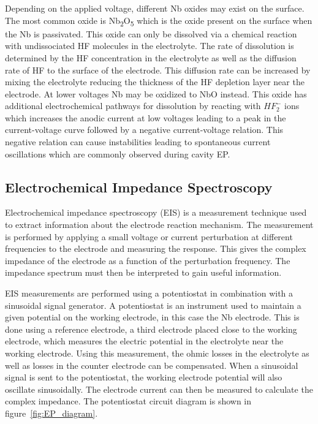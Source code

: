 Depending on the applied voltage, different Nb oxides may exist on the surface. The most common oxide is Nb\textsubscript{2}O\textsubscript{5} which is the oxide present on the surface when the Nb is passivated. This oxide can only be dissolved via a chemical reaction with undissociated HF molecules in the electrolyte. The rate of dissolution is determined by the HF concentration in the electrolyte as well as the diffusion rate of HF to the surface of the electrode. This diffusion rate can be increased by mixing the electrolyte reducing the thickness of the HF depletion layer near the electrode\cite{tian2010evaluation}. At lower voltages Nb may be oxidized to NbO instead. This oxide has additional electrochemical pathways for dissolution by reacting with $HF_2^-$ ions which increases the anodic current at low voltages leading to a peak in the current-voltage curve followed by a negative current-voltage relation\cite{ranjith2018anodic}. This negative relation can cause instabilities leading to spontaneous current oscillations which are commonly observed during cavity EP\cite{khun2013smoothening}.









\subsection{Electrochemical Impedance Spectroscopy}


Electrochemical impedance spectroscopy (EIS) is a measurement technique used to extract information about the electrode reaction mechanism. The measurement is performed by applying a small voltage or current perturbation at different frequencies to the electrode and measuring the response. This gives the complex impedance of the electrode as a function of the perturbation frequency. The impedance spectrum must then be interpreted to gain useful information.

EIS measurements are performed using a potentiostat in combination with a sinusoidal signal generator. A potentiostat is an instrument used to maintain a given potential on the working electrode, in this case the Nb electrode. This is done using a reference electrode, a third electrode placed close to the working electrode, which measures the electric potential in the electrolyte near the working electrode. Using this measurement, the ohmic losses in the electrolyte as well as losses in the counter electrode can be compensated. When a sinusoidal signal is sent to the potentiostat, the working electrode potential will also oscillate sinusoidally. The electrode current can then be measured to calculate the complex impedance. The potentiostat circuit diagram is shown in figure~\ref{fig:EP_diagram}.

